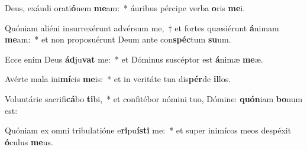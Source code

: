 \item Deus, exáudi orati\textbf{ó}nem \textbf{me}am:~* áuribus pércipe verba \textbf{o}ris \textbf{me}i.
\item Quóniam aliéni insurrexérunt advérsum me,~† et fortes quæsiérunt \textbf{á}nimam \textbf{me}am:~* et non proposuérunt Deum ante con\textbf{spéc}tum \textbf{su}um.
\item Ecce enim Deus \textbf{ád}ju\textbf{vat} me:~* et Dóminus suscéptor est \textbf{á}nimæ \textbf{me}æ.
\item Avérte mala ini\textbf{mí}cis \textbf{me}is:~* et in veritáte tua dis\textbf{pér}de \textbf{il}los.
\item Voluntárie sacrifi\textbf{cá}bo \textbf{ti}bi,~* et confitébor nómini tuo, Dómine: \textbf{quón}iam \textbf{bo}num est:
\item Quóniam ex omni tribulatióne e\textbf{ri}pu\textbf{ís}\textbf{ti} me:~* et super inimícos meos despéxit \textbf{ó}culus \textbf{me}us.
